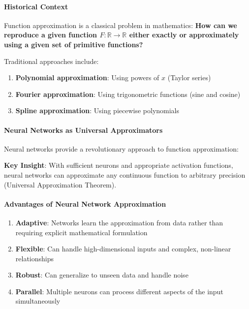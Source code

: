 \paragraph{Historical Context}
\label{para:historical-context-function-approx}

Function approximation is a classical problem in mathematics: \textbf{How can we reproduce a given function $F : \mathbb{R} \to \mathbb{R}$ either exactly or approximately using a given set of primitive functions?}

Traditional approaches include:

\begin{enumerate}
\item \textbf{Polynomial approximation}: Using powers of $x$ (Taylor series)
\item \textbf{Fourier approximation}: Using trigonometric functions (sine and cosine)
\item \textbf{Spline approximation}: Using piecewise polynomials
\end{enumerate}

\paragraph{Neural Networks as Universal Approximators}
\label{para:nn-universal-approximators}

Neural networks provide a revolutionary approach to function approximation:

\textbf{Key Insight}: With sufficient neurons and appropriate activation functions, neural networks can approximate any continuous function to arbitrary precision (Universal Approximation Theorem).

\paragraph{Advantages of Neural Network Approximation}
\label{para:advantages-nn-approximation}

\begin{enumerate}
\item \textbf{Adaptive}: Networks learn the approximation from data rather than requiring explicit mathematical formulation
\item \textbf{Flexible}: Can handle high-dimensional inputs and complex, non-linear relationships
\item \textbf{Robust}: Can generalize to unseen data and handle noise
\item \textbf{Parallel}: Multiple neurons can process different aspects of the input simultaneously
\end{enumerate}

